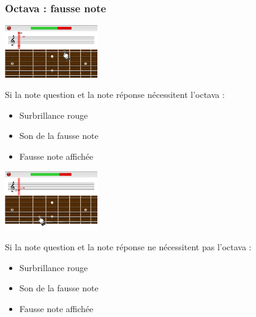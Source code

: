 \documentclass{beamer}
\begin{document}
\begin{frame}
	\frametitle{Octava : fausse note}

	\begin{minipage}{0.35\linewidth}
             \includegraphics[width=4cm]{images/portee_deux_octava.png}
        \end{minipage}\hfill
           \begin{minipage}{0.6\linewidth}
		Si la note question et la note réponse nécessitent l'octava :
                 \begin{itemize}
                      \item Surbrillance rouge
                      \item Son de la fausse note
		      \item Fausse note affichée
                 \end{itemize}
         \end{minipage}
\bigbreak

	\begin{minipage}{0.35\linewidth}
             \includegraphics[width=4cm]{images/portee_octava_tap2.png}
       \end{minipage}\hfill
              \begin{minipage}{0.6\linewidth}
			Si la note question et la note réponse ne nécessitent pas l'octava :
                 \begin{itemize}
                     \item Surbrillance rouge
                     \item Son de la fausse note
		    \item Fausse note affichée
             \end{itemize}
         \end{minipage}
\end{frame} 
\end{document}
